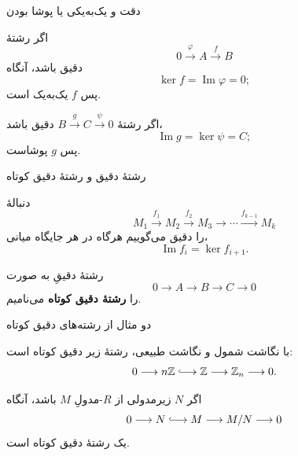 \begin{frame}[t]{دقت و یک‌به‌یکی یا پوشا بودن}
    \label{lec16:exact-mono-epi}
    \begin{remark}
        اگر رشتهٔ
        \[
            0\xrightarrow{\varphi}A\xrightarrow{f}B
        \]
        دقیق باشد، آنگاه
        \[
            \ker f=\operatorname{Im}\varphi=0;
        \]
        پس \(f\) یک‌به‌یک است.
    \end{remark}
    \begin{remark}
        اگر رشتهٔ \(B\xrightarrow{g}C\xrightarrow{\psi}0\) دقیق باشد،
        \[
            \operatorname{Im}g=\ker\psi=C;
        \]
        پس \(g\) پوشاست.
    \end{remark}
\end{frame}

\begin{frame}[t]{رشتهٔ دقیق و رشتهٔ دقیق کوتاه}
    \label{lec16:short-exact-definition}
    \begin{definition}
        دنبالهٔ
        \[
            M_1\xrightarrow{f_1}M_2\xrightarrow{f_2}M_3
            \longrightarrow\cdots\xrightarrow{f_{k-1}}M_k
        \]
        را دقیق می‌گوییم هرگاه در هر جایگاه میانی،
        \[
            \operatorname{Im}f_i=\ker f_{i+1}.
        \]
    \end{definition}
    \begin{definition}
        رشتهٔ دقیقِ به صورت
        \[
            0\longrightarrow A\longrightarrow B\longrightarrow C\longrightarrow0
        \]
        را \textbf{رشتهٔ دقیق کوتاه} می‌نامیم.
    \end{definition}
\end{frame}

\begin{frame}[t]{دو مثال از رشته‌های دقیق کوتاه}
    \label{lec16:short-exact-examples}
    \begin{example}
        با نگاشت شمول و نگاشت طبیعی، رشتهٔ زیر دقیق کوتاه است:
        \[
            0\longrightarrow n\mathbb Z\lhook\joinrel\longrightarrow
            \mathbb Z\longrightarrow\mathbb Z_n\longrightarrow0.
        \]
    \end{example}
    \begin{example}
        اگر \(N\) زیرمدولی از \(R\)-مدولِ \(M\) باشد، آنگاه
        \[
            0\longrightarrow N\lhook\joinrel\longrightarrow M
            \longrightarrow M/N\longrightarrow0
        \]
        یک رشتهٔ دقیق کوتاه است.
    \end{example}
\end{frame}

